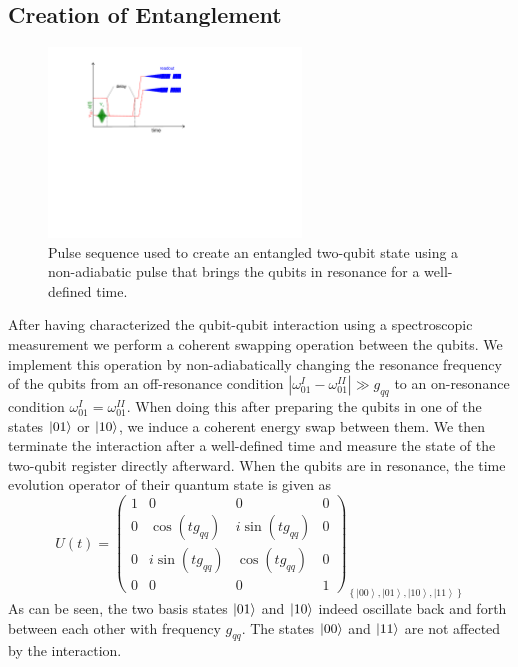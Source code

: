 \subsection{Creation of Entanglement} \label{section:creation_of_entanglement}

\begin{figure}
	\centering
	\includegraphics[width=0.6\textwidth]{"./material/figures/measurement/qubit_swap"}
	\caption[Pulse sequence used to create an entangled two-qubit state]{Pulse sequence used to create an entangled two-qubit state using a non-adiabatic pulse that brings the qubits in resonance for a well-defined time.}
	\label{fig:qubit_swap_pulse_sequence}
\end{figure}

After having characterized the qubit-qubit interaction using a spectroscopic measurement we perform a coherent swapping operation between the qubits. We implement this operation by non-adiabatically changing the resonance frequency of the qubits from an off-resonance condition $|\omega_{01}^I-\omega_{01}^{II}|\gg g_{qq}$ to an on-resonance condition $\omega_{01}^I=\omega_{01}^{II}$. When doing this after preparing the qubits in one of the states $\left| 01 \right>$ or $\left| 10 \right>$, we induce a coherent energy swap between them. We then terminate the interaction after a well-defined time and measure the state of the two-qubit register directly afterward. When the qubits are in resonance, the time evolution operator of their quantum state is given as
%
\begin{equation}
U(t)=\left(\begin{array}{cccc}
1 & 0 & 0 & 0\\
0 & \cos{(tg_{qq})} & i\sin{(tg_{qq})} & 0\\
0 & i\sin{(tg_{qq})} & \cos{(tg_{qq})} & 0\\
0 & 0 & 0 & 1\end{array}\right)_{\left\{ \left|00\right\rangle ,\left|01\right\rangle ,\left|10\right\rangle ,\left|11\right\rangle \right\} } \label{eq:swap_evolution_operator_main}
\end{equation}
%
As can be seen, the two basis states $\left| 01 \right>$ and $\left| 10 \right>$ indeed oscillate back and forth between each other with frequency $g_{qq}$. The states $\left| 00 \right>$ and $\left| 11 \right>$ are not affected by the interaction.

